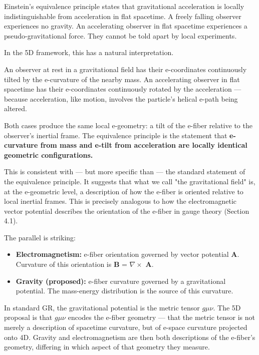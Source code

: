 \documentclass[aps,prd,preprint,superscriptaddress,longbibliography,floatfix]{revtex4-2}
\theoremstyle{remark}
\begin{document}
Einstein's equivalence principle states that gravitational acceleration is locally indistinguishable from acceleration in flat spacetime. A freely falling observer experiences no gravity. An accelerating observer in flat spacetime experiences a pseudo-gravitational force. They cannot be told apart by local experiments.

In the 5D framework, this has a natural interpretation.

An observer at rest in a gravitational field has their e-coordinates continuously tilted by the e-curvature of the nearby mass. An accelerating observer in flat spacetime has their e-coordinates continuously rotated by the acceleration --- because acceleration, like motion, involves the particle's helical e-path being altered.

Both cases produce the same local e-geometry: a tilt of the e-fiber relative to the observer's inertial frame. The equivalence principle is the statement that \textbf{e-curvature from mass and e-tilt from acceleration are locally identical geometric configurations.}

This is consistent with --- but more specific than --- the standard statement of the equivalence principle. It suggests that what we call "the gravitational field" is, at the e-geometric level, a description of how the e-fiber is oriented relative to local inertial frames. This is precisely analogous to how the electromagnetic vector potential describes the orientation of the e-fiber in gauge theory (Section 4.1).

The parallel is striking:


\begin{itemize}
  \item \textbf{Electromagnetism:} e-fiber orientation governed by vector potential \textbf{A}. Curvature of this orientation is \textbf{B} = $\nabla \times$ \textbf{A}.
  \item \textbf{Gravity (proposed):} e-fiber curvature governed by a gravitational potential. The mass-energy distribution is the source of this curvature.
\end{itemize}

In standard GR, the gravitational potential is the metric tensor $g\mu\nu$. The 5D proposal is that $g\mu\nu$ encodes the e-fiber geometry --- that the metric tensor is not merely a description of spacetime curvature, but of e-space curvature projected onto 4D. Gravity and electromagnetism are then both descriptions of the e-fiber's geometry, differing in which aspect of that geometry they measure.
\end{document}
